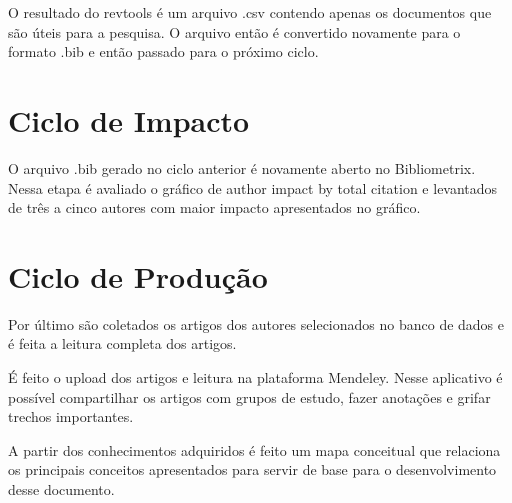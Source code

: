 O resultado do revtools é um arquivo .csv contendo apenas os documentos que são úteis para a pesquisa. O arquivo então é convertido novamente para o formato .bib e então passado para o próximo ciclo.

\section{Ciclo de Impacto}
O arquivo .bib gerado no ciclo anterior é novamente aberto no Bibliometrix. Nessa etapa é avaliado o gráfico de author impact by total citation e levantados de três a cinco autores com maior impacto apresentados no gráfico.

\section{Ciclo de Produção}
Por último são coletados os artigos dos autores selecionados no banco de dados e é feita a leitura completa dos artigos. 

É feito o upload dos artigos e leitura na plataforma Mendeley. Nesse aplicativo é possível compartilhar os artigos com grupos de estudo, fazer anotações e grifar trechos importantes. 

A partir dos conhecimentos adquiridos é feito um mapa conceitual que relaciona os principais conceitos apresentados para servir de base para o desenvolvimento desse documento.